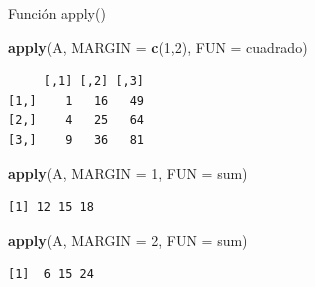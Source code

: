 \documentclass[
  ignorenonframetext,
  aspectratio=169]{beamer}
\newenvironment{Shaded}{\begin{snugshade}}{\end{snugshade}}
\newcommand{\AttributeTok}[1]{\textcolor[rgb]{0.13,0.29,0.53}{#1}}
\newcommand{\DecValTok}[1]{\textcolor[rgb]{0.00,0.00,0.81}{#1}}
\newcommand{\FunctionTok}[1]{\textcolor[rgb]{0.13,0.29,0.53}{\textbf{#1}}}
\newcommand{\NormalTok}[1]{#1}
\begin{document}
\begin{frame}[fragile]{Función apply()}
\label{funciuxf3n-apply-1}
\begin{Shaded}
\begin{Highlighting}[]
\FunctionTok{apply}\NormalTok{(A, }\AttributeTok{MARGIN =} \FunctionTok{c}\NormalTok{(}\DecValTok{1}\NormalTok{,}\DecValTok{2}\NormalTok{), }\AttributeTok{FUN =}\NormalTok{ cuadrado)}
\end{Highlighting}
\end{Shaded}

\begin{verbatim}
     [,1] [,2] [,3]
[1,]    1   16   49
[2,]    4   25   64
[3,]    9   36   81
\end{verbatim}

\begin{Shaded}
\begin{Highlighting}[]
\FunctionTok{apply}\NormalTok{(A, }\AttributeTok{MARGIN =} \DecValTok{1}\NormalTok{, }\AttributeTok{FUN =}\NormalTok{ sum)}
\end{Highlighting}
\end{Shaded}

\begin{verbatim}
[1] 12 15 18
\end{verbatim}

\begin{Shaded}
\begin{Highlighting}[]
\FunctionTok{apply}\NormalTok{(A, }\AttributeTok{MARGIN =} \DecValTok{2}\NormalTok{, }\AttributeTok{FUN =}\NormalTok{ sum)}
\end{Highlighting}
\end{Shaded}

\begin{verbatim}
[1]  6 15 24
\end{verbatim}
\end{frame}
\end{document}
